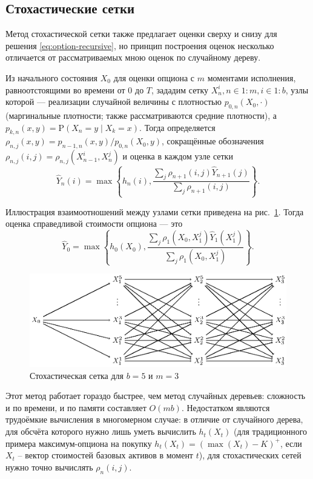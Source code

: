 \documentclass[specialist,
               substylefile = ../spbu.rtx,
               subf,href,colorlinks=true, 12pt]{disser}
\newcommand{\prob}[1]{\mathrm{P}\left(#1\right)}
\begin{document}


\subsection{Стохастические сетки} %
\label{sub:mesh_estimator}

Метод стохастической сетки также предлагает оценки сверху и снизу для решения \eqref{eq:option-recursive}, но принцип построения оценок несколько отличается от рассматриваемых мною оценок по случайному дереву.

Из начального состояния $X_0$ для оценки опциона с $m$ моментами исполнения, равноотстоящими во времени от 0 до $T$, зададим сетку $X_n^i, n\in 1\mathbin{:}m, i \in 1\mathbin{:}b$, узлы которой --- реализации случайной величины с плотностью $p_{0, n}(X_0, \cdot)$ (маргинальные плотности; также рассматриваются средние плотности), а $p_{k, n}(x, y) = \prob{X_n = y \middle\vert X_k = x}$. Тогда определяется $\rho_{n, j}(x, y) = p_{n-1, n}(x, y) / p_{0, n}(X_0, y)$, сокращённые обозначения $\rho_{n, j}(i, j) = \rho_{n, j}(X_{n-1}^i, X_n^j)$ и оценка в каждом узле сетки
$$\hat Y_n(i) = \max\left\lbrace h_n(i), \frac{\sum_j \rho_{n+1}(i, j) \hat Y_{n+1}(j)}{\sum_j \rho_{n+1}(i, j)} \right\rbrace.$$

Иллюстрация взаимоотношений между узлами сетки приведена на рис.~\ref{fig:stochastic_mesh}. Тогда оценка справедливой стоимости опциона --- это $$\hat Y_0 = \max\left\lbrace h_0(X_0), \frac{\sum_j \rho_{1}(X_0, X_1^j) \hat Y_{1}(X_1^j)}{\sum_j \rho_{1}(X_0, X_1^j)} \right\rbrace.$$

\begin{figure}[t]
    \centering
	\includegraphics{stohastic_mesh_vector.eps}
	\caption{Стохастическая сетка для $b = 5$ и $m = 3$}
	\label{fig:stochastic_mesh}
\end{figure}

Этот метод работает гораздо быстрее, чем метод случайных деревьев: сложность и по времени, и по памяти составляет $O(mb)$. Недостатком являются трудоёмкие вычисления в многомерном случае: в отличие от случайного дерева, для обсчёта которого нужно лишь уметь вычислить $h_t(X_t)$ (для традиционного примера максимум-опциона на покупку $h_t(X_t) = \left(\max(X_t) - K\right)^+$, если $X_t$ -- вектор стоимостей базовых активов в момент $t$), для стохастических сетей нужно точно вычислять $\rho_n(i, j)$.
\end{document}
